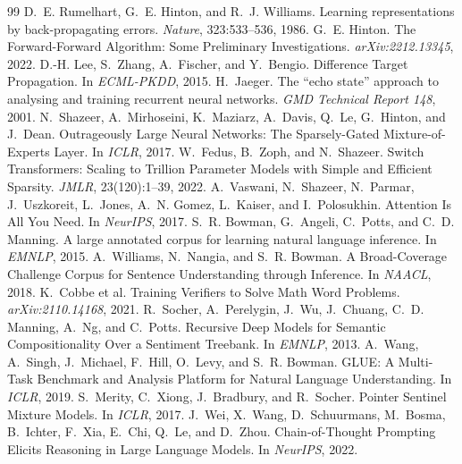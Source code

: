 \documentclass[11pt]{article}
\begin{document}
\begin{thebibliography}{99}
 D.~E. Rumelhart, G.~E. Hinton, and R.~J. Williams. Learning representations by
back-propagating errors. \emph{Nature}, 323:533--536, 1986.
 G.~E. Hinton. The Forward-Forward Algorithm: Some Preliminary Investigations.
\emph{arXiv:2212.13345}, 2022.
 D.-H. Lee, S.~Zhang, A.~Fischer, and Y.~Bengio. Difference Target Propagation.
In \emph{ECML-PKDD}, 2015.
 H.~Jaeger. The ``echo state'' approach to analysing and training recurrent neural
networks. \emph{GMD Technical Report 148}, 2001.
 N.~Shazeer, A.~Mirhoseini, K.~Maziarz, A.~Davis, Q.~Le, G.~Hinton, and J.~Dean.
Outrageously Large Neural Networks: The Sparsely-Gated Mixture-of-Experts Layer. In \emph{ICLR}, 2017.
 W.~Fedus, B.~Zoph, and N.~Shazeer. Switch Transformers: Scaling to Trillion
Parameter Models with Simple and Efficient Sparsity. \emph{JMLR}, 23(120):1--39, 2022.
 A.~Vaswani, N.~Shazeer, N.~Parmar, J.~Uszkoreit, L.~Jones, A.~N. Gomez,
L.~Kaiser, and I.~Polosukhin. Attention Is All You Need. In \emph{NeurIPS}, 2017.
 S.~R. Bowman, G.~Angeli, C.~Potts, and C.~D. Manning. A large annotated corpus for
learning natural language inference. In \emph{EMNLP}, 2015.
 A.~Williams, N.~Nangia, and S.~R. Bowman. A Broad-Coverage Challenge Corpus for
Sentence Understanding through Inference. In \emph{NAACL}, 2018.
 K.~Cobbe et al. Training Verifiers to Solve Math Word Problems.
\emph{arXiv:2110.14168}, 2021.
 R.~Socher, A.~Perelygin, J.~Wu, J.~Chuang, C.~D. Manning, A.~Ng, and C.~Potts.
Recursive Deep Models for Semantic Compositionality Over a Sentiment Treebank. In \emph{EMNLP}, 2013.
 A.~Wang, A.~Singh, J.~Michael, F.~Hill, O.~Levy, and S.~R. Bowman. GLUE: A Multi-Task
Benchmark and Analysis Platform for Natural Language Understanding. In \emph{ICLR}, 2019.
 S.~Merity, C.~Xiong, J.~Bradbury, and R.~Socher. Pointer Sentinel Mixture
Models. In \emph{ICLR}, 2017.
 J.~Wei, X.~Wang, D.~Schuurmans, M.~Bosma, B.~Ichter, F.~Xia, E.~Chi, Q.~Le, and
D.~Zhou. Chain-of-Thought Prompting Elicits Reasoning in Large Language Models. In \emph{NeurIPS}, 2022.
\end{thebibliography}
\end{document}
